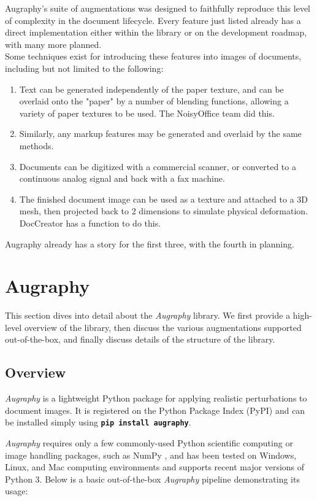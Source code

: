 \documentclass[runningheads]{llncs}
\begin{document}
Augraphy's suite of augmentations was designed to faithfully reproduce this level of complexity in the document lifecycle. Every feature just listed already has a direct implementation either within the library or on the development roadmap, with many more planned.\\

Some techniques exist for introducing these features into images of documents, including but not limited to the following:
\begin{enumerate}
\item Text can be generated independently of the paper texture, and can be overlaid onto the "paper" by a number of blending functions, allowing a variety of paper textures to be used. The NoisyOffice team did this.
\item Similarly, any markup features may be generated and overlaid by the same methods.
\item Documents can be digitized with a commercial scanner, or converted to a continuous analog signal and back with a fax machine.
\item The finished document image can be used as a texture and attached to a 3D mesh, then projected back to 2 dimensions to simulate physical deformation. DocCreator has a function to do this.
\end{enumerate}

Augraphy already has a story for the first three, with the fourth in planning.

\section{Augraphy}
This section dives into detail about the \emph{Augraphy} library.
We first provide a high-level overview of the library, then discuss the various augmentations supported out-of-the-box, and finally discuss details of the structure of the library.

\subsection{Overview}

\emph{Augraphy} is a lightweight Python package for applying realistic perturbations to document images. It is registered on the Python Package Index (PyPI) and can be installed simply using \colorbox{superlightgray}{\textbf{\texttt{pip install augraphy}}}.

\emph{Augraphy} requires only a few commonly-used Python scientific computing or image handling packages, such as NumPy \cite{ref_numpy}, and has been tested on Windows, Linux, and Mac computing environments and supports recent major versions of Python 3.  Below is a basic out-of-the-box \emph{Augraphy} pipeline demonstrating its usage:
\end{document}
